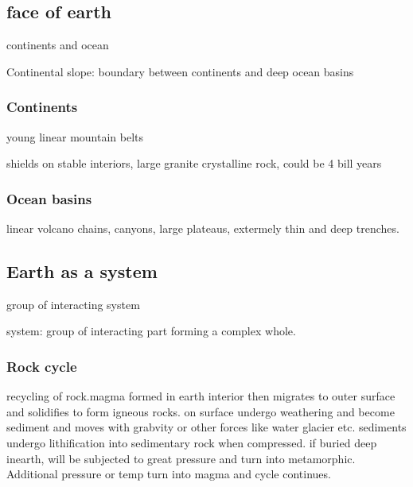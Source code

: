 \documentclass[11pt]{amsart}
\begin{document}
  \subsection{face of earth}
  \par continents and ocean
  \par Continental slope: boundary between continents and deep ocean basins
  \subsubsection{Continents}
  \par young linear mountain belts
  \par shields on stable interiors, large granite crystalline rock, could be 4
  bill years
  \subsubsection{Ocean basins}
  \par linear volcano chains, canyons, large plateaus, extermely thin and deep
  trenches.
  \subsection{Earth as a system}
  \par group of interacting system
  \par system: group of interacting part forming a complex whole.
  \subsubsection{Rock cycle}
  \par recycling of rock.magma formed in earth interior  then migrates to outer
  surface and solidifies to form igneous rocks. on surface undergo weathering
  and become sediment and moves with grabvity or other forces like water
  glacier etc. sediments undergo lithification into sedimentary rock when
  compressed. if buried deep inearth, will be subjected to great pressure and
  turn into metamorphic. Additional pressure or temp turn into magma and cycle
  continues.
\end{document}
